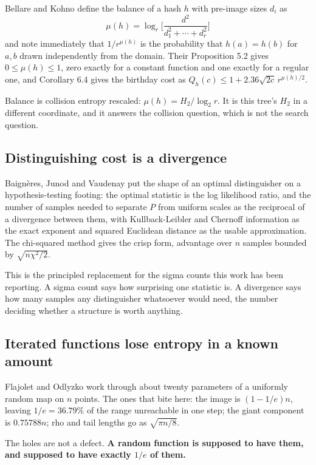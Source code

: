 Bellare and Kohno define the balance of a hash \(h\) with pre-image sizes \(d_i\) as
\[
\mu(h) = \log_r\Big[\frac{d^2}{d_1^2 + \cdots + d_r^2}\Big]
\]
and note immediately that \(1/r^{\mu(h)}\) is the probability that \(h(a) = h(b)\) for \(a, b\) drawn independently from the domain. Their Proposition 5.2 gives \(0 \le \mu(h) \le 1\), zero exactly for a constant function and one exactly for a regular one, and Corollary 6.4 gives the birthday cost as \(Q_h(c) \le 1 + 2.36\sqrt{2c}\, r^{\mu(h)/2}\).

Balance is collision entropy rescaled: \(\mu(h) = H_2 / \log_2 r\). It is this tree's \(H_2\) in a different coordinate, and it answers the collision question, which is not the search question.

\subsection{Distinguishing cost is a divergence}

Baignères, Junod and Vaudenay put the shape of an optimal distinguisher on a hypothesis-testing footing: the optimal statistic is the log likelihood ratio, and the number of samples needed to separate \(P\) from uniform scales as the reciprocal of a divergence between them, with Kullback-Leibler and Chernoff information as the exact exponent and squared Euclidean distance as the usable approximation. The chi-squared method gives the crisp form, advantage over \(n\) samples bounded by \(\sqrt{n\chi^2/2}\).

This is the principled replacement for the sigma counts this work has been reporting. A sigma count says how surprising one statistic is. A divergence says how many samples any distinguisher whatsoever would need, the number deciding whether a structure is worth anything.

\subsection{Iterated functions lose entropy in a known amount}

Flajolet and Odlyzko work through about twenty parameters of a uniformly random map on \(n\) points. The ones that bite here: the image is \((1 - 1/e)n\), leaving \(1/e = 36.79\%\) of the range unreachable in one step; the giant component is \(0.75788n\); rho and tail lengths go as \(\sqrt{\pi n / 8}\).

The holes are not a defect. \textbf{A random function is supposed to have them, and supposed to have exactly \(1/e\) of them.}

